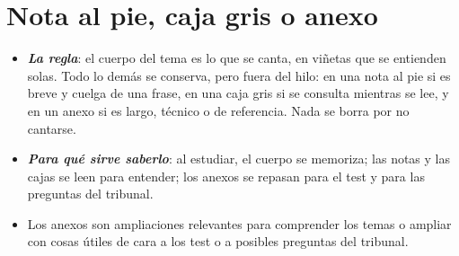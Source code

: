 \documentclass[11pt]{article}
\begin{document}
\section{Nota al pie, caja gris o anexo}\label{sec:donde}

\begin{itemize}
\item \textbf{\emph{La regla}}: el cuerpo del tema es lo que se canta, en viñetas que se entienden solas. Todo lo demás se conserva, pero fuera del hilo: en una nota al pie si es breve y cuelga de una frase, en una caja gris si se consulta mientras se lee, y en un anexo si es largo, técnico o de referencia. Nada se borra por no cantarse.
\item \textbf{\emph{Para qué sirve saberlo}}: al estudiar, el cuerpo se memoriza; las notas y las cajas se leen para entender; los anexos se repasan para el test y para las preguntas del tribunal.
\item Los anexos son ampliaciones relevantes para comprender los temas o ampliar con cosas útiles de cara a los test o a posibles preguntas del tribunal.
\end{itemize}
\end{document}
